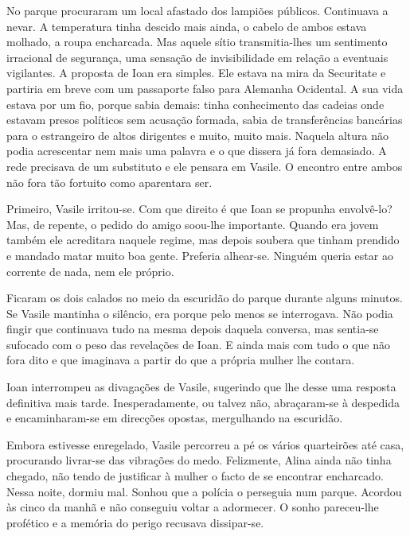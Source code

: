 No parque procuraram um local afastado dos lampiões públicos. Continuava
a nevar. A temperatura tinha descido mais ainda, o cabelo de ambos
estava molhado, a roupa encharcada. Mas aquele sítio transmitia-lhes um
sentimento irracional de segurança, uma sensação de invisibilidade
em relação a eventuais vigilantes. A proposta de Ioan era simples. Ele
estava na mira da Securitate e partiria em breve com um passaporte falso
para Alemanha Ocidental. A sua vida estava por um fio, porque sabia
demais: tinha conhecimento das cadeias onde estavam presos políticos sem
acusação formada, sabia de transferências bancárias para o estrangeiro
de altos dirigentes e muito, muito mais. Naquela altura não podia
acrescentar nem mais uma palavra e o que dissera já fora demasiado. A
rede precisava de um substituto e ele pensara em Vasile. O encontro
entre ambos não fora tão fortuito como aparentara ser.

Primeiro, Vasile irritou-se. Com que direito é que Ioan se propunha
envolvê-lo? Mas, de repente, o pedido do amigo soou-lhe importante.
Quando era jovem também ele acreditara naquele regime, mas depois
soubera que tinham prendido e mandado matar muito boa gente. Preferia
alhear-se. Ninguém queria estar ao corrente de nada, nem ele próprio.

Ficaram os dois calados no meio da escuridão do parque durante alguns
minutos. Se Vasile mantinha o silêncio, era porque pelo menos se
interrogava. Não podia fingir
que continuava tudo na mesma depois daquela conversa, mas sentia-se
sufocado com o peso das revelações de Ioan. E ainda mais com tudo o que
não fora dito e que imaginava a partir do que a própria mulher lhe
contara.

Ioan interrompeu as divagações de Vasile, sugerindo que lhe desse uma
resposta definitiva mais tarde. Inesperadamente, ou talvez não,
abraçaram-se à despedida e encaminharam-se em direcções opostas,
mergulhando na escuridão.

Embora estivesse enregelado, Vasile percorreu a pé os vários quarteirões
até casa, procurando livrar-se das vibrações do medo. Felizmente,
Alina ainda não tinha chegado, não tendo de justificar à mulher o facto
de se encontrar encharcado. Nessa noite, dormiu mal. Sonhou que a polícia o perseguia num parque. Acordou às cinco da manhã e não conseguiu
voltar a adormecer. O sonho pareceu-lhe profético e a memória do perigo
recusava dissipar-se.

